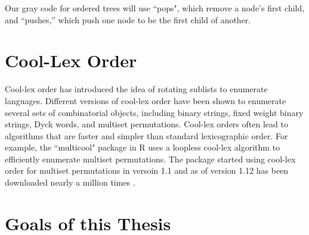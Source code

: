 Our gray code for ordered trees will use ``pops", which remove a node's first child, and ``pushes,'' which push one node to be the first child of another. 


\section{Cool-Lex Order}
Cool-lex order has introduced the idea of rotating sublists to enumerate languages.  Different versions of cool-lex order have been shown to enumerate several sets of combinatorial objects, including binary strings, fixed weight binary strings, Dyck words, and multiset permutations.  Cool-lex orders often lead to algorithms that are faster and simpler than standard lexicographic order.  For example, the ``multicool" package in R uses a loopless cool-lex algorithm to efficiently enumerate multiset permutations.   The package started using cool-lex order for multiset permutations in versoin 1.1 and as of version 1.12 has been downloaded nearly a million times \cite{multicool_2021}.



\section{Goals of this Thesis}


